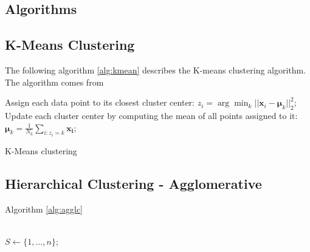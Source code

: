 \documentclass[12pt,a4paper,bibliography=totocnumbered,listof=totocnumbered]{scrartcl}
\begin{document}
{\begin{appendix}
\section{Algorithms}

\subsection{K-Means Clustering}

The following algorithm \ref{alg:kmean} describes the K-means clustering algorithm. The algorithm comes from \cite[page 354 et. seqq.]{Murphy2012}

\IncMargin{1em}
\begin{algorithm}
	\BlankLine
	\Repeat 
		Assign each data point to its closest cluster center: $z_i = \arg \min_k || \boldsymbol{x}_i - \boldsymbol{\mu}_k ||^2_2;$ 
		Update each cluster center by computing the mean of all points assigned to it: $\boldsymbol{\mu}_k = \frac{1}{N_k}\sum_{i:z_i=k}\boldsymbol{x_i};$
	\caption{K-Means clustering}\label{algo_disjdecomp}
	\label{alg:kmean}
\end{algorithm}\DecMargin{1em}
\pagebreak

\subsection{Hierarchical Clustering - Agglomerative}

Algorithm \ref{alg:agglc} \cite[page 895 et. seqq.]{Murphy2012}

\IncMargin{1em}
\begin{algorithm}
	\BlankLine
	 \\
	    $S \leftarrow \{1, \dots, n\};$ \\
		

\end{algorithm}
\end{appendix}}
\end{document}

